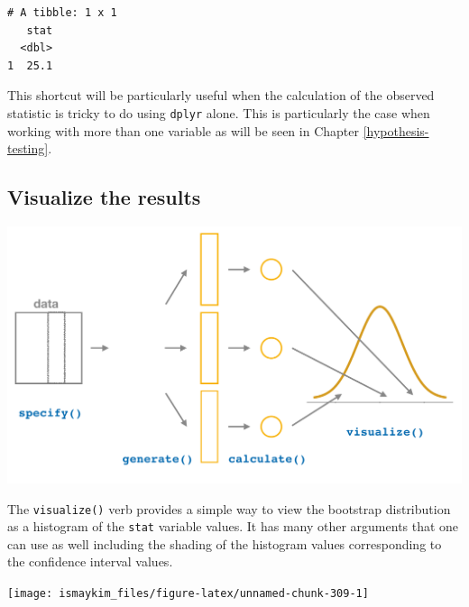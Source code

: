 \documentclass[12pt,]{krantz}
\makeatletter
\newenvironment{Shaded}{\begin{snugshade}}{\end{snugshade}}
\newcommand{\KeywordTok}[1]{\textcolor[rgb]{0.27,0.27,0.27}{\textbf{#1}}}
\newcommand{\StringTok}[1]{\textcolor[rgb]{0.5,0.5,0.5}{#1}}
\newcommand{\OperatorTok}[1]{\textcolor[rgb]{0.43,0.43,0.43}{\textbf{#1}}}
\newcommand{\NormalTok}[1]{#1}
\newenvironment{kframe}{%
\medskip{}
\setlength{\fboxsep}{.8em}
 \def\at@end@of@kframe{}%
 \ifinner\ifhmode%
  \def\at@end@of@kframe{\end{minipage}}%
  \begin{minipage}{\columnwidth}%
 \fi\fi%
 \def\FrameCommand##1{\hskip\@totalleftmargin \hskip-\fboxsep
 \colorbox{shadecolor}{##1}\hskip-\fboxsep
     \hskip-\linewidth \hskip-\@totalleftmargin \hskip\columnwidth}%
 \MakeFramed {\advance\hsize-\width
   \@totalleftmargin\z@ \linewidth\hsize
   \@setminipage}}%
 {\par\unskip\endMakeFramed%
 \at@end@of@kframe}
\renewenvironment{Shaded}{\begin{kframe}}{\end{kframe}}
\theoremstyle{definition}
\theoremstyle{definition}
\theoremstyle{definition}
\theoremstyle{remark}
\makeatother
\begin{document}
\begin{verbatim}
# A tibble: 1 x 1
   stat
  <dbl>
1  25.1
\end{verbatim}

This shortcut will be particularly useful when the calculation of the
observed statistic is tricky to do using \texttt{dplyr} alone. This is
particularly the case when working with more than one variable as will
be seen in Chapter \ref{hypothesis-testing}.

\subsection{Visualize the results}\label{visualize-the-results}

\begin{center}\includegraphics[width=\textwidth]{images/flowcharts/infer/visualize} \end{center}

The \texttt{visualize()} verb provides a simple way to view the
bootstrap distribution as a histogram of the \texttt{stat} variable
values. It has many other arguments that one can use as well including
the shading of the histogram values corresponding to the confidence
interval values.

\begin{Shaded}
\end{Shaded}

\begin{center}\texttt{[image: ismaykim\_files/figure-latex/unnamed-chunk-309-1]} \end{center}
\end{document}
